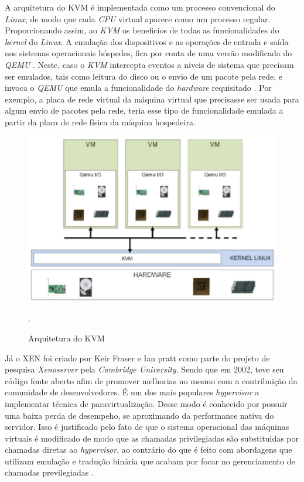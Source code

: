 A arquitetura do KVM é implementada como um processo convencional do \textit{Linux}, de modo que cada \textit{CPU} virtual aparece como um processo regular. Proporcionando assim, ao \textit{KVM} os beneficios de todas as funcionalidades do \textit{kernel} do \textit{Linux}\cite{redhatkvm}. A emulação dos dispositivos e as operações de entrada e saída nos sistemas operacionais hóspedes, fica por conta de uma versão modificada do \textit{QEMU} \cite{redhatkvm,qumranet}. Neste, caso o \textit{KVM} intercepta eventos a niveis de sistema que precisam ser emulados, tais como leitura do disco ou o envio de um pacote pela rede, e invoca o \textit{QEMU} que emula a funcionalidade do \textit{hardware} requisitado \cite{rasmusson}. Por exemplo, a placa de rede virtual da máquina virtual que precisasse ser usada para algum envio de pacotes pela rede, teria esse tipo de funcionalidade emulada a partir da placa de rede física da máquina hospedeira. 

\begin{figure}[!htb]
\centering
\includegraphics [keepaspectratio=true,scale=0.6]{figuras/kvm_arc.eps}
\caption{Arquitetura do KVM}
\cite{fabiano}.
\label{kvm_arc}
\end{figure}

Já o XEN foi criado por Keir Fraser e Ian pratt como parte do projeto de pesquisa \textit{Xenoserver} pela \textit{Cambridge University}. Sendo que em 2002, teve seu código fonte aberto afim de promover melhorias no mesmo com a contribuição da comunidade de desenvolvedores. É um dos mais populares \textit{hypervisor} a implementar técnica de paravirtualização\cite{xen}. Desse modo é conhecido por possuir uma baixa perda de desempeho, se aproximando da performance nativa do servidor\cite{walters}. Isso é justificado pelo fato de que o sistema operacional das máquinas virtuais é modificado de modo que as chamadas privilegiadas são substituidas por chamadas diretas ao \textit{hypervisor}, ao contrário do que é feito com abordagens que utilizam emulação e tradução binária que acabam por focar no gerenciamento de chamadas previlegiadas \cite{redhatkvm}. 

